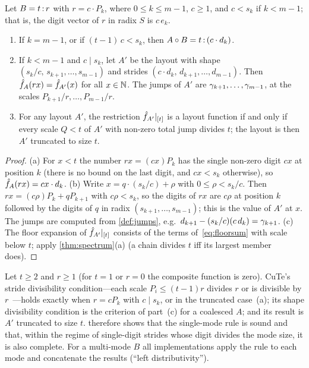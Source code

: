 \begin{proposition}\label{prop:monomial}
Let $B=t\,{:}\,r$ with $r=c\cdot P_k$, where $0\le k\le m-1$, $c\ge1$, and $c<s_k$ if $k<m-1$; that
is, the digit vector of $r$ in radix $S$ is $c\,e_k$.
\begin{enumerate}[label=(\alph*),itemsep=1pt]
\item If $k=m-1$, or if $(t-1)\,c<s_k$, then $A\circ B=t\,{:}\,(c\cdot d_k)$.
\item If $k<m-1$ and $c\mid s_k$, let $A'$ be the layout with shape
 $(s_k/c,\,s_{k+1},\dots,s_{m-1})$ and strides $(c\cdot d_k,\,d_{k+1},\dots,d_{m-1})$. Then
 $\hat{f}_{A}(rx)=\hat{f}_{A'}(x)$ for all $x\in\mathbb{N}$. The jumps of $A'$ are
 $\gamma_{k+1},\dots,\gamma_{m-1}$, at the scales $P_{k+1}/r,\dots,P_{m-1}/r$.
\item For any layout $A'$, the restriction $\hat{f}_{A'}|_{[t]}$ is a layout function if and only
 if every scale $Q<t$ of $A'$ with non-zero total jump divides $t$; the layout is then $A'$
 truncated to size $t$.
\end{enumerate}
\end{proposition}
\begin{proof}
(a) For $x<t$ the number $rx=(cx)P_k$ has the single non-zero digit $cx$ at position $k$ (there
is no bound on the last digit, and $cx<s_k$ otherwise), so $\hat{f}_{A}(rx)=cx\cdot d_k$.
(b) Write $x=q\cdot(s_k/c)+\rho$ with $0\le\rho<s_k/c$. Then $rx=(c\rho)P_k+qP_{k+1}$ with
$c\rho<s_k$, so the digits of $rx$ are $c\rho$ at position $k$ followed by the digits of $q$ in
radix $(s_{k+1},\dots,s_{m-1})$; this is the value of $A'$ at $x$. The jumps are computed from
\cref{def:jumps}, e.g.\ $d_{k+1}-(s_k/c)(c\,d_k)=\gamma_{k+1}$.
(c) The floor expansion of $\hat{f}_{A'}|_{[t]}$ consists of the terms of~\eqref{eq:floorsum} with
scale below $t$; apply \cref{thm:spectrum}(a) (a chain divides $t$ iff its largest member does).
\end{proof}

Let $t\ge2$ and $r\ge1$ (for $t=1$ or $r=0$ the composite function is zero). CuTe's stride
divisibility condition---each scale $P_i\le(t-1)r$ divides $r$ or is divisible by
$r$~\cite{cecka2026}---holds exactly when $r=cP_k$ with $c\mid s_k$, or in the truncated
case~(a); its shape divisibility condition is the criterion of part~(c) for a coalesced $A$; and
its result is $A'$ truncated to size $t$.  therefore shows that the
single-mode rule is sound and that, within the regime of single-digit strides whose digit divides
the mode size, it is also complete. For a multi-mode $B$ all implementations apply the rule to
each mode and concatenate the results (``left distributivity'').

